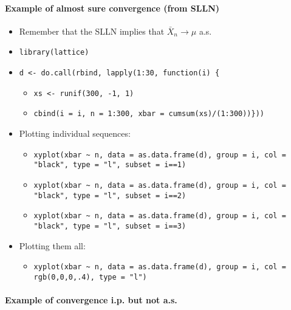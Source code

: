\paragraph{Example of almost sure convergence (from SLLN)}
\label{sec-1-5-1}

\begin{itemize}
\item Remember that the SLLN implies that $\bar X_n \to \mu$ a.s.
\item \texttt{library(lattice)}
\item \texttt{d <- do.call(rbind, lapply(1:30, function(i) \{}
\begin{itemize}
\item \texttt{xs <- runif(300, -1, 1)}
\item \texttt{cbind(i = i, n = 1:300, xbar = cumsum(xs)/(1:300))\}))}
\end{itemize}
\item Plotting individual sequences:
\begin{itemize}
\item \texttt{xyplot(xbar \textasciitilde{} n, data = as.data.frame(d), group = i, col = "black", type = "l", subset = i==1)}
\item \texttt{xyplot(xbar \textasciitilde{} n, data = as.data.frame(d), group = i, col = "black", type = "l", subset = i==2)}
\item \texttt{xyplot(xbar \textasciitilde{} n, data = as.data.frame(d), group = i, col = "black", type = "l", subset = i==3)}
\end{itemize}
\item Plotting them all:
\begin{itemize}
\item \texttt{xyplot(xbar \textasciitilde{} n, data = as.data.frame(d), group = i, col = rgb(0,0,0,.4), type = "l")}
\end{itemize}
\end{itemize}
\paragraph{Example of convergence i.p. but not a.s.}
\label{sec-1-5-2}

